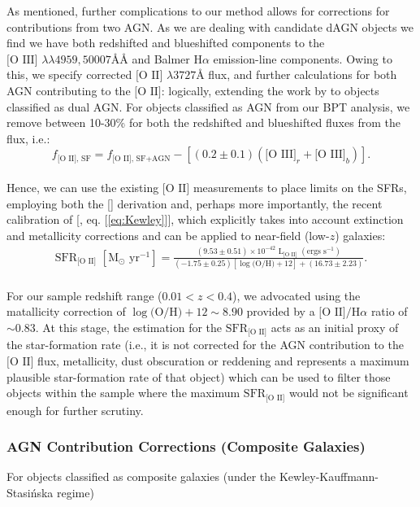 As mentioned, further complications to our method allows for corrections for contributions from two AGN. As we are dealing with candidate dAGN objects we find we have both redshifted and blueshifted components to the $\text{[O III] }\lambda\lambda4959,50007ÅÅ$ and Balmer $\text{H}\alpha$ emission-line components. Owing to this, we specify corrected $\text{[O II] }\lambda3727Å$ flux, and further calculations for both AGN contributing to the $\text{[O II]}$: logically, extending the work by \cite{2006ApJ...642..702K} to objects classified as dual AGN. For objects classified as AGN from our BPT analysis, we remove between 10-30\% for both the redshifted and blueshifted \text{[O III]} fluxes from the \text{[O II]} flux, i.e.:
\\
\begin{equation}
\label{eq:KimCorrection}
f_{\text{[O II], SF}}=f_{\text{[O II], SF+AGN}}-\left[(0.2\pm{0.1})(\text{[O III]}_r+\text{[O III]}_b)\right].
\end{equation}
\\

Hence, we can use the existing $\text{[O II]}$ measurements to place limits on the SFRs, employing both the [\cite{Kennicutt_1998}] derivation and, perhaps more importantly, the recent calibration of [\cite{Kewley_2004}, eq. [\ref{eq:Kewley}]], which explicitly takes into account extinction and metallicity corrections and can be applied to near-field (low-$z$) galaxies:
\\
\begin{equation}
\begin{align}
\label{eq:Kewley}
{\text{SFR}}_{\text{[O II]}}\,\,[\text{M}_\odot \text{ yr}^{-1}]=\frac{(9.53\pm{0.51})\times10^{-42}\,\,\text{L}_{\text{[O II]}}\,\,(\text{ergs }\text{s}^{-1})}{(-1.75\pm{0.25})[\log{\text{(O/H)}}+12]+(16.73\pm{2.23})}.
\end{align}
\end{equation}
\\
For our sample redshift range (${{0.01}<{z}<{0.4}}$), we advocated using the \cite{Teplitz_2003} matallicity correction of $\log{\text{(O/H)} +12}\sim{8.90}$ provided by a $\text{[O II]/H}\alpha$ ratio of $\sim{0.83}$. At this stage, the \cite{Kennicutt_1998} estimation for the $\text{SFR}_{\text{[O II]}}$ acts as an initial proxy of the star-formation rate (i.e., it is not corrected for the AGN contribution to the $\text{[O II]}$ flux, metallicity, dust obscuration or reddening and represents a maximum plausible star-formation rate of that object) which can be used to filter those objects within the sample where the maximum $\text{SFR}_{\text{[O II]}}$ would not be significant enough for further scrutiny.

\subsubsection{AGN Contribution Corrections (Composite Galaxies)}

For objects classified as composite galaxies (under the Kewley-Kauffmann-Stasi{\'n}ska regime) 